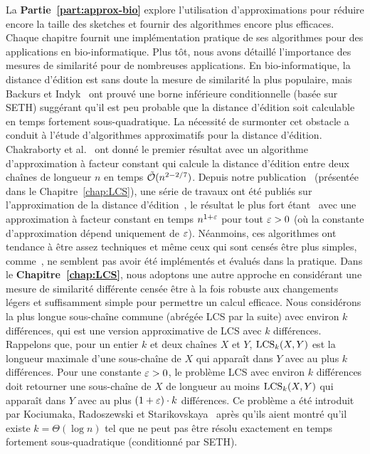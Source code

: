 La \textbf{Partie~\ref{part:approx-bio}} explore l'utilisation d'approximations pour réduire encore la taille des sketches et fournir des algorithmes encore plus efficaces. Chaque chapitre fournit une implémentation pratique de ses algorithmes pour des applications en bio-informatique.
%
Plus tôt, nous avons détaillé l'importance des mesures de similarité pour de nombreuses applications.
%
En bio-informatique, la distance d'édition est sans doute la mesure de similarité la plus populaire, mais Backurs et Indyk~\cite{DBLP:conf/stoc/BackursI15} ont prouvé une borne inférieure conditionnelle (basée sur SETH) suggérant qu'il est peu probable que la distance d'édition soit calculable en temps fortement sous-quadratique.
%
La nécessité de surmonter cet obstacle a conduit à l'étude d'algorithmes approximatifs pour la distance d'édition. Chakraborty et al.~\cite{DBLP:conf/focs/ChakrabortyDGKS18} ont donné le premier résultat avec un algorithme d'approximation à facteur constant qui calcule la distance d'édition entre deux chaînes de longueur $n$ en temps $\tilde{\mathcal{O}}(n^{2-2/7})$.
Depuis notre publication~\cite{DBLP:conf/cpm/GourdelKRS20} (présentée dans le Chapitre~\ref{chap:LCS}), une série de travaux ont été publiés sur l'approximation de la distance d'édition~\cite{brakensiek2020constant,koucky2020constant}, le résultat le plus fort étant~\cite{andoni2020edit} avec une approximation à facteur constant en temps $n^{1+\varepsilon}$ pour tout $\varepsilon>0$ (où la constante d'approximation dépend uniquement de $\varepsilon$).
Néanmoins, ces algorithmes ont tendance à être assez techniques et même ceux qui sont censés être plus simples, comme~\cite{andoni2020simple}, ne semblent pas avoir été implémentés et évalués dans la pratique.
%
Dans le \textbf{Chapitre~\ref{chap:LCS}}, nous adoptons une autre approche en considérant une mesure de similarité différente censée être à la fois robuste aux changements légers et suffisamment simple pour permettre un calcul efficace. Nous considérons la plus longue sous-chaîne commune (abrégée LCS par la suite) avec environ $k$ différences, qui est une version approximative de LCS avec $k$ différences. Rappelons que, pour un entier $k$ et deux chaînes $X$ et $Y$, $\mathrm{LCS}_{k}(X,Y)$ est la longueur maximale d'une sous-chaîne de $X$ qui apparaît dans $Y$ avec au plus $k$ différences.
Pour une constante $\varepsilon > 0$, le problème LCS avec environ $k$ différences doit retourner une sous-chaîne de $X$ de longueur au moins $\mathrm{LCS}_{k}(X,Y)$ qui apparaît dans $Y$ avec au plus $(1+\varepsilon) \cdot k$ différences. Ce problème a été introduit par Kociumaka, Radoszewski et Starikovskaya~\cite{DBLP:journals/algorithmica/KociumakaRS19} après qu'ils aient montré qu'il existe $k=\Theta(\log n)$ tel que \kLCS ne peut pas être résolu exactement en temps fortement sous-quadratique (conditionné par SETH).
